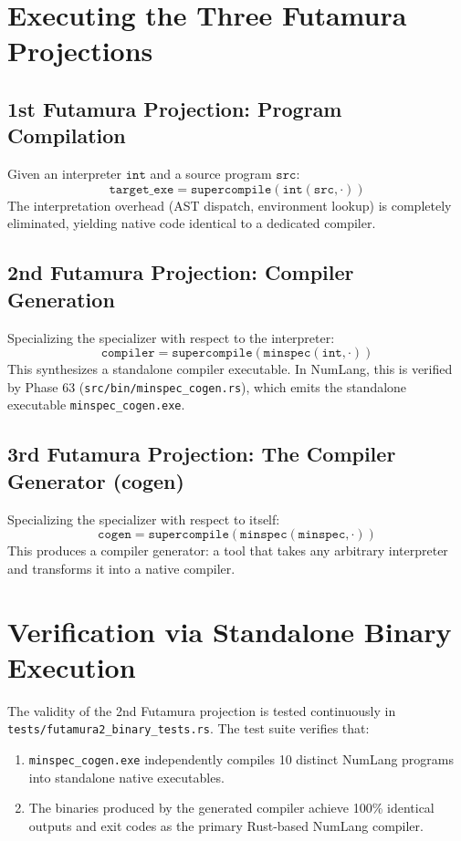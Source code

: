 \section{Executing the Three Futamura Projections}
\label{sec:futamura:projections}

\subsection{1st Futamura Projection: Program Compilation}
Given an interpreter $\mathtt{int}$ and a source program $\mathtt{src}$:
\begin{equation}
\mathtt{target\_exe} = \mathtt{supercompile}(\mathtt{int}(\mathtt{src}, \cdot))
\end{equation}
The interpretation overhead (AST dispatch, environment lookup) is completely eliminated, yielding native code identical to a dedicated compiler.

\subsection{2nd Futamura Projection: Compiler Generation}
Specializing the specializer with respect to the interpreter:
\begin{equation}
\mathtt{compiler} = \mathtt{supercompile}(\mathtt{minspec}(\mathtt{int}, \cdot))
\end{equation}
This synthesizes a standalone compiler executable. In NumLang, this is verified by Phase 63 (\texttt{src/bin/minspec\_cogen.rs}), which emits the standalone executable \texttt{minspec\_cogen.exe}.

\subsection{3rd Futamura Projection: The Compiler Generator (cogen)}
Specializing the specializer with respect to itself:
\begin{equation}
\mathtt{cogen} = \mathtt{supercompile}(\mathtt{minspec}(\mathtt{minspec}, \cdot))
\end{equation}
This produces a compiler generator: a tool that takes any arbitrary interpreter and transforms it into a native compiler.

\section{Verification via Standalone Binary Execution}
\label{sec:futamura:tests}

The validity of the 2nd Futamura projection is tested continuously in \texttt{tests/futamura2\_binary\_tests.rs}. The test suite verifies that:
\begin{enumerate}
    \item \texttt{minspec\_cogen.exe} independently compiles 10 distinct NumLang programs into standalone native executables.
    \item The binaries produced by the generated compiler achieve 100\% identical outputs and exit codes as the primary Rust-based NumLang compiler.
\end{enumerate}

